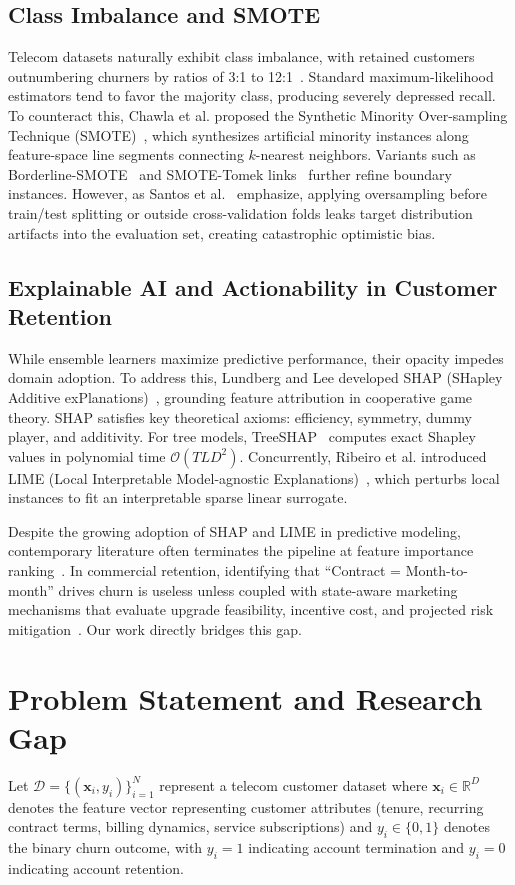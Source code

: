 \documentclass[conference]{IEEEtran}
\begin{document}
\subsection{Class Imbalance and SMOTE}
Telecom datasets naturally exhibit class imbalance, with retained customers outnumbering churners by ratios of 3:1 to 12:1~\cite{idris2014churn}. Standard maximum-likelihood estimators tend to favor the majority class, producing severely depressed recall. To counteract this, Chawla et al. proposed the Synthetic Minority Over-sampling Technique (SMOTE)~\cite{chawla2002smote}, which synthesizes artificial minority instances along feature-space line segments connecting $k$-nearest neighbors. Variants such as Borderline-SMOTE~\cite{han2005borderline} and SMOTE-Tomek links~\cite{batista2004study} further refine boundary instances. However, as Santos et al.~\cite{santos2018avoiding} emphasize, applying oversampling before train/test splitting or outside cross-validation folds leaks target distribution artifacts into the evaluation set, creating catastrophic optimistic bias.

\subsection{Explainable AI and Actionability in Customer Retention}
While ensemble learners maximize predictive performance, their opacity impedes domain adoption. To address this, Lundberg and Lee developed SHAP (SHapley Additive exPlanations)~\cite{lundberg2017unified}, grounding feature attribution in cooperative game theory. SHAP satisfies key theoretical axioms: efficiency, symmetry, dummy player, and additivity. For tree models, TreeSHAP~\cite{lundberg2020local} computes exact Shapley values in polynomial time $\mathcal{O}(TLD^2)$. Concurrently, Ribeiro et al. introduced LIME (Local Interpretable Model-agnostic Explanations)~\cite{ribeiro2016why}, which perturbs local instances to fit an interpretable sparse linear surrogate.

Despite the growing adoption of SHAP and LIME in predictive modeling, contemporary literature often terminates the pipeline at feature importance ranking~\cite{albuquerque2022machine}. In commercial retention, identifying that ``Contract = Month-to-month'' drives churn is useless unless coupled with state-aware marketing mechanisms that evaluate upgrade feasibility, incentive cost, and projected risk mitigation~\cite{de2021retention}. Our work directly bridges this gap.

\section{Problem Statement and Research Gap}
Let $\mathcal{D} = \{(\mathbf{x}_i, y_i)\}_{i=1}^N$ represent a telecom customer dataset where $\mathbf{x}_i \in \mathbb{R}^D$ denotes the feature vector representing customer attributes (tenure, recurring contract terms, billing dynamics, service subscriptions) and $y_i \in \{0, 1\}$ denotes the binary churn outcome, with $y_i = 1$ indicating account termination and $y_i = 0$ indicating account retention. 
\end{document}
